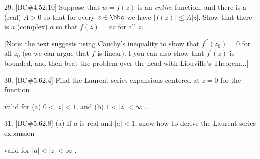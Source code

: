 






\loadmsbm


\dl{\displaystyle}
\ctln{\centerline}
\ssk{\smallskip}
\msk{\medskip}
\bsk{\bigskip}
\ubr{\underbar}


\overfullrule=0pt
\nopagenumbers






\msk




\bsk

\bsk


\item{29.}  [BC\#4.52.10] Suppose that $w=f(z)$ is an {\it entire} function,
and there is a (real) $A>0$ so that for every $z\in\bbc$ we have
$|f(z)|\leq A|z|$. Show that there is a (complex) $a$ so that $f(z)=az$
for all $z$.

\msk

\item{} [Note: the text suggests using Cauchy's inequality to show that
$f^{\prime\prime}(z_0)=0$ for all $z_0$ (so we can argue that $f$ is linear).
I  you can also show that $f^\prime(z)$ is bounded, and
then beat the problem over the head with Liouville's Theorem...]


\bsk


\item{30.} [BC\#5.62.4] Find the Laurent series expansions centered at
$z=0$ for the function 

\ssk


\ssk

\item{} valid for (a) $0<|z|<1$, and (b) $1<|z|<\infty$ .


\bsk


\item{31.} [BC\#5.62.8] (a) If $a$ is real and $|a|<1$, show how to derive the
Laurent series expansion

\ssk


\ssk

\item{} valid for $|a|<|z|<\infty$ .

